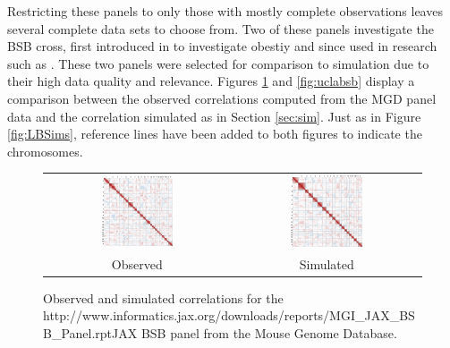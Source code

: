 \documentclass{article}
\newcommand{\href}[1]{#1} %
\begin{document}
Restricting these panels to only those with mostly complete observations leaves several complete data sets to choose from. Two of these panels investigate the BSB cross, first introduced in \cite{fisleretal1993bsb} to investigate obestiy and since used in research such as \cite{montagutellietal1996epistatic, cheverud2001, watkinsetal2008genomic}. These two panels were selected for comparison to simulation due to their high data quality and relevance. Figures \ref{fig:jaxbsb} and \ref{fig:uclabsb} display a comparison between the observed correlations computed from the MGD panel data and the correlation simulated as in Section \ref{sec:sim}. Just as in Figure \ref{fig:LBSims}, reference lines have been added to both figures to indicate the chromosomes.

\begin{figure}[htp]
  \begin{center}
    \begin{tabular}{cc}
      \includegraphics[width = 0.400\textwidth]{./img/jaxbsb.png} &
      \includegraphics[width = 0.400\textwidth]{./img/jaxbsb_sim.png} \\
      {\footnotesize Observed} &
      {\footnotesize Simulated}
    \end{tabular}
  \end{center}
  \caption{Observed and simulated correlations for the \href{http://www.informatics.jax.org/downloads/reports/MGI_JAX_BSB_Panel.rpt}{JAX BSB panel} from the Mouse Genome Database.}
  \label{fig:jaxbsb}
\end{figure}
\end{document}
